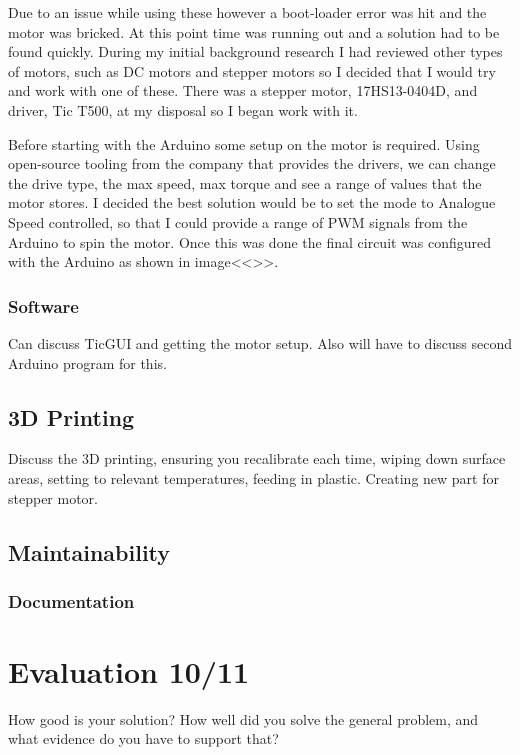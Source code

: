 \documentclass{l4proj}
\begin{document}
Due to an issue while using these however a boot-loader error was hit and the motor was bricked. At this point time was running out and a solution had to be found quickly. During my initial background research I had reviewed other types of motors, such as DC motors and stepper motors so I decided that I would try and work with one of these. There was a stepper motor, 17HS13-0404D, and driver, Tic T500, at my disposal so I began work with it. 

Before starting with the Arduino some setup on the motor is required. Using open-source tooling from the company that provides the drivers, we can change the drive type, the max speed, max torque and see a range of values that the motor stores. I decided the best solution would be to set the mode to Analogue Speed controlled, so that I could provide a range of PWM signals from the Arduino to spin the motor. Once this was done the final circuit was configured with the Arduino as shown in image<<>>.


\subsection{Software}
Can discuss TicGUI and getting the motor setup. Also will have to discuss second Arduino program for this. 

\section{3D Printing}
Discuss the 3D printing, ensuring you recalibrate each time, wiping down surface areas, setting to relevant temperatures, feeding in plastic.
Creating new part for stepper motor. 

\section{Maintainability}
\subsection{Documentation}
\chapter{Evaluation 10/11} 
How good is your solution? How well did you solve the general problem, and what evidence do you have to support that?
\end{document}
